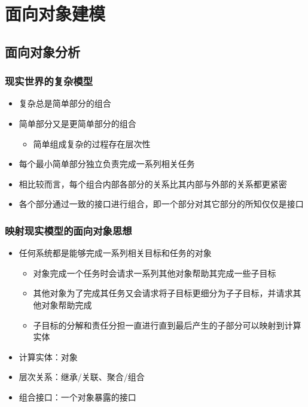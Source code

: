 \section{面向对象建模}

\subsection{面向对象分析}

\subsubsection{现实世界的复杂模型}
\begin{itemize}
    \item 复杂总是简单部分的组合
    \item 简单部分又是更简单部分的组合
    \begin{itemize}
        \item 简单组成复杂的过程存在层次性
    \end{itemize}
    \item 每个最小简单部分独立负责完成一系列相关任务
    \item 相比较而言，每个组合内部各部分的关系比其内部与外部的关系都更紧密
    \item 各个部分通过一致的接口进行组合，即一个部分对其它部分的所知仅仅是接口
\end{itemize}

\subsubsection{映射现实模型的面向对象思想}
\begin{itemize}
    \item 任何系统都是能够完成一系列相关目标和任务的对象
    \begin{itemize}
        \item 对象完成一个任务时会请求一系列其他对象帮助其完成一些子目标
        \item 其他对象为了完成其任务又会请求将子目标更细分为子子目标，并请求其他对象帮助完成
        \item 子目标的分解和责任分担一直进行直到最后产生的子部分可以映射到计算实体
    \end{itemize}
\end{itemize}

\vspace{-0.8em}
\begin{multicols}{3}
    \begin{itemize}
        \item 计算实体：对象
        \item 层次关系：继承/关联、聚合/组合
        \item 组合接口：一个对象暴露的接口
    \end{itemize}
\end{multicols}
\vspace{-1em}

